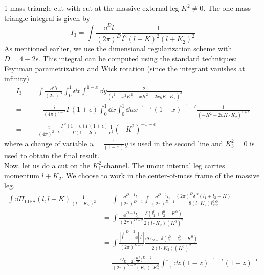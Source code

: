 1-mass triangle cut with cut at the massive external leg $K^2 \neq 0$.
The one-mass triangle integral is given by 
\begin{equation*}
I_3 = \int\frac{\dd^D l }{(2\pi)^D}\frac{1}{l^2(l-K)^2(l+K_2)^2}
\end{equation*}
As mentioned earlier, we use the dimensional regularization scheme with $D = 4-2\epsilon$.
This integral can be computed using the standard techniques: Feynman parametrization and Wick rotation (since the integrant vanishes at infinity)
\begin{equation*}
\begin{split}
I_3 = & \int\frac{\dd^D l }{(2\pi)^D}\int_0^{1} \dd x \int_0^{1-x}\dd y \frac{2!}{(l^2 - x^2 K^2 + xK^2 + 2xy K\cdot K_2)^3}
\\
= &
-\frac{i}{(4\pi)^{2-\epsilon}}\Gamma (1+\epsilon)
\int^1_0 \dd x\int_0^1 \dd u x^{-1-\epsilon} (1-x)^{-1-\epsilon}
\frac{1}{(-K^2 - 2uK\cdot K_2)^{1+\epsilon}}
\\
= &
\frac{i}{(4\pi)^{2-\epsilon}}\frac{\Gamma^2(1-\epsilon)\Gamma(1+\epsilon)}{\Gamma(1-2\epsilon)}
\frac{1}{\epsilon^2}(-K^2)^{-1-\epsilon}
\end{split}
\end{equation*}
where a change of variable $u =\frac{1}{(1-x)}y$ is used in the second line and $K_3^2 = 0$ is used to obtain the final result.
\\
Now, let us do a cut on the $K_1^2$-channel. 
The uncut internal leg carries momentum $l + K_2$. 
We choose to work in the center-of-mass frame of the massive leg.
%
\begin{equation*}
\begin{split}
\int\dd \Pi_{\textrm{LIPS}}(l, l-K) \frac{1}{(l+K_2)^2} & =
\int\frac{\dd^{D-1}l_1}{(2\pi)^{D-1}}\int\frac{\dd^{D-1}l_2}{(2\pi)^{D-1}}
\frac{(2\pi)^{D}\delta^{D}(l_1 + l_2 - K)}{8(l\cdot K_2)l_1^0 l_2^0}
\\
& = \int\frac{\dd^{D-1}l_1}{(2\pi)^{D-2}}\frac{\delta(l_1^0 + l_2^0 - K^0)}{2(l\cdot K_2)(K^0)^2} 
\\
& = \int\frac{|\vec{l}|^{D-2}\dd |\vec{l}|}{(2\pi)^{D-2}} \frac{\dd\Omega_{D-1}\delta(l_1^0 + l_2^0 - K^0)}{2 ( l \cdot K_2)(K^0)^2}
\\
& = \frac{\Omega_{D-2}\big(\frac{K^0}{2}\big)^{D-2}}{(2\pi)^{D-2}(K_0)^3 K^0_2} \int_{-1}^1\dd z (1-z)^{-1-\epsilon}(1+z)^{-\epsilon}
\end{split} 
\end{equation*}
